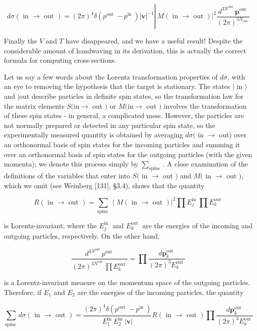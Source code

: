 \documentclass[10pt, letterpaper]{article}
\begin{document}
$$
d \sigma(\text { in } \rightarrow \text { out })=(2 \pi)^{4} \delta\left(p^{\text {out }}-p^{\text {in }}\right)|\mathbf{v}|^{-1} \left\lvert\,\left. M(\text { in } \rightarrow \text { out })\right|^{2} \frac{d^{3 N^{\text {out }}} \mathbf{p}^{\text {out }}}{(2 \pi)^{3 N_{\text {out }}}}\right.
$$

Finally the $V$ and $T$ have disappeared, and we have a useful result! Despite the considerable amount of handwaving in its derivation, this is actually the correct formula for computing cross-sections.

Let us say a few words about the Lorentz transformation properties of $d \sigma$, with an eye to removing the hypothesis that the target is stationary. The states $\mid$ in $\rangle$ and |out describe particles in definite spin states, so the transformation law for the matrix elements $S(\mathrm{in} \rightarrow$ out $)$ or $M(\mathrm{in} \rightarrow$ out $)$ involves the transformation of these spin states - in general, a complicated mess. However, the particles are not normally prepared or detected in any particular spin state, so the experimentally measured quantity is obtained by averaging $d \sigma($ in $\rightarrow$ out) over an orthonormal basis of spin states for the incoming particles and summing it over an orthonormal basis of spin states for the outgoing particles (with the given momenta); we denote this process simply by $\sum_{\text {spins }}$. A close examination of the definitions of the variables that enter into $S($ in $\rightarrow$ out $)$ and $M($ in $\rightarrow$ out $)$, which we omit (see Weinberg [131], §3.4), shows that the quantity

$$
R(\text { in } \rightarrow \text { out })=\sum_{\text {spins }} \mid\left. M(\text { in } \rightarrow \text { out })\right|^{2} \prod E_{j}^{\text {in }} \prod E_{k}^{\text {out }}
$$

is Lorentz-invariant, where the $E_{j}^{\text {in }}$ and $E_{k}^{\text {out }}$ are the energies of the incoming and outgoing particles, respectively. On the other hand,

$$
\frac{d^{3 N^{\text {out }}} p^{\text {out }}}{(2 \pi)^{3 N^{\text {out }}} \prod E_{k}^{\text {out }}}=\prod \frac{d \mathbf{p}_{k}^{\text {out }}}{(2 \pi)^{3} E_{k}^{\text {out }}}
$$

is a Lorentz-invariant measure on the momentum space of the outgoing particles. Therefore, if $E_{1}$ and $E_{2}$ are the energies of the incoming particles, the quantity

$$
\sum_{\text {spins }} d \sigma(\text { in } \rightarrow \text { out })=\frac{(2 \pi)^{4} \delta\left(p^{\text {out }}-p^{\text {in }}\right)}{E_{1}^{\text {in }} E_{2}^{\text {in }}|\mathbf{v}|} R(\text { in } \rightarrow \text { out }) \prod \frac{d \mathbf{p}_{k}^{\text {out }}}{(2 \pi)^{3} E_{k}^{\text {out }}}
$$
\end{document}
